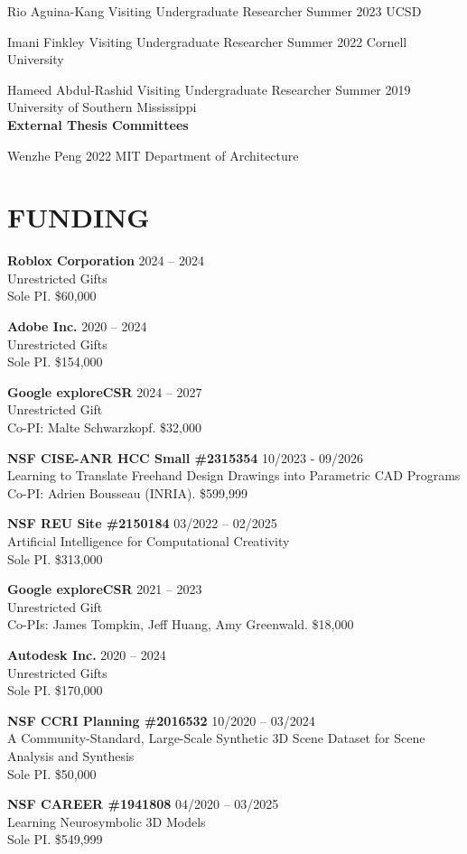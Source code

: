 \documentclass[line,margin]{res}
\begin{document}
\begin{resume}
\visitor
{Rio Aguina-Kang}
{Visiting Undergraduate Researcher}
{Summer 2023}
{UCSD}

\visitor
{Imani Finkley}
{Visiting Undergraduate Researcher}
{Summer 2022}
{Cornell University}

\visitor
{Hameed Abdul-Rashid}
{Visiting Undergraduate Researcher}
{Summer 2019}
{University of Southern Mississippi}
\\


\textbf{External Thesis Committees}

\thesiscomm
{Wenzhe Peng}
{2022}
{MIT Department of Architecture}


\section{FUNDING}

\newcommand{\funding}[5] {
	\textbf{#1} \hfill #5\\
	#2 \\
	#3. #4
}

\funding
{Roblox Corporation}
{Unrestricted Gifts}
{Sole PI}
{\$60,000}
{2024 -- 2024}

\funding
{Adobe Inc.}
{Unrestricted Gifts}
{Sole PI}
{\$154,000}
{2020 -- 2024}

\funding
{Google exploreCSR}
{Unrestricted Gift}
{Co-PI: Malte Schwarzkopf}
{\$32,000}
{2024 -- 2027}

\funding
{NSF CISE-ANR HCC Small \#2315354}
{Learning to Translate Freehand Design Drawings into Parametric CAD Programs}
{Co-PI: Adrien Bousseau (INRIA)}
{\$599,999}
{10/2023 - 09/2026}

\funding
{NSF REU Site \#2150184}
{Artificial Intelligence for Computational Creativity}
{Sole PI}
{\$313,000}
{03/2022 -- 02/2025}

\funding
{Google exploreCSR}
{Unrestricted Gift}
{Co-PIs: James Tompkin, Jeff Huang, Amy Greenwald}
{\$18,000}
{2021 -- 2023}

\funding
{Autodesk Inc.}
{Unrestricted Gifts}
{Sole PI}
{\$170,000}
{2020 -- 2024}

\funding
{NSF CCRI Planning \#2016532}
{A Community-Standard, Large-Scale Synthetic 3D Scene Dataset for Scene Analysis and Synthesis}
{Sole PI}
{\$50,000}
{10/2020 -- 03/2024}

\funding
{NSF CAREER \#1941808}
{Learning Neurosymbolic 3D Models}
{Sole PI}
{\$549,999}
{04/2020 -- 03/2025}


\end{resume}
\end{document}

